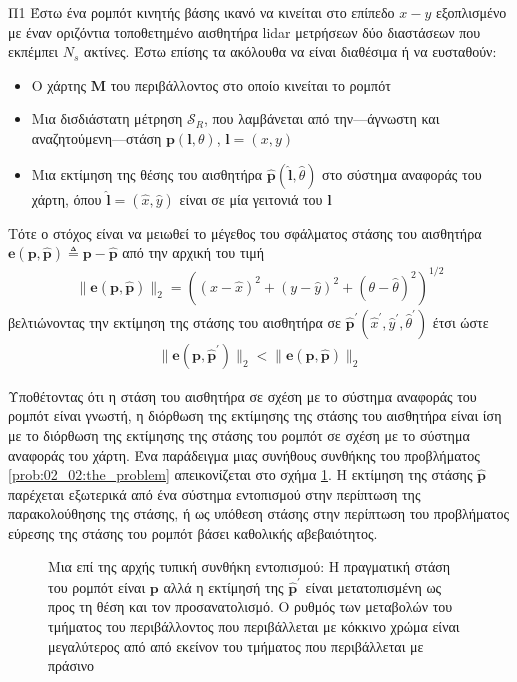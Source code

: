 \begin{bw_box}
\begin{customproblem}{Π1}
  \label{prob:02_02:the_problem}
  Έστω ένα ρομπότ κινητής βάσης ικανό να κινείται στο επίπεδο $x-y$ εξοπλισμένο
  με έναν οριζόντια τοποθετημένο αισθητήρα lidar μετρήσεων δύο διαστάσεων
  που εκπέμπει $N_s$ ακτίνες. Έστω επίσης τα ακόλουθα να είναι διαθέσιμα ή να
  ευσταθούν:
  \begin{itemize}
    \item Ο χάρτης $\bm{M}$ του περιβάλλοντος στο οποίο κινείται το ρομπότ
    \item Μια δισδιάστατη μέτρηση $\mathcal{S}_R$, που λαμβάνεται από
          την---άγνωστη και αναζητούμενη---στάση $\bm{p}(\bm{l},\theta)$,
          $\bm{l} = (x,y)$
    \item Μια εκτίμηση της θέσης του αισθητήρα
          $\hat{\bm{p}}(\hat{\bm{l}}, \hat{\theta})$ στο σύστημα αναφοράς του
          χάρτη, όπου $\hat{\bm{l}} = (\hat{x}, \hat{y})$ είναι σε μία γειτονιά
          του $\bm{l}$
  \end{itemize}
\end{customproblem}
Τότε ο στόχος είναι να μειωθεί το μέγεθος του σφάλματος στάσης του αισθητήρα
$\bm{e}(\bm{p}, \hat{\bm{p}}) \triangleq \bm{p}- \hat{\bm{p}}$ από την αρχική
του τιμή
\begin{align}
  \|\bm{e}(\bm{p}, \hat{\bm{p}})\|_2 = ((x- \hat{x})^2 + (y- \hat{y})^2 + (\theta- \hat{\theta})^2)^{1/2}
  \label{eq:pose_error_def}
\end{align}
βελτιώνοντας την εκτίμηση της στάσης του αισθητήρα σε
$\hat{\bm{p}}^\prime(\hat{x}^\prime, \hat{y}^\prime, \hat{\theta}^\prime)$ έτσι ώστε
\begin{align}
  \|\bm{e}(\bm{p}, \hat{\bm{p}}^\prime)\|_2 < \|\bm{e}(\bm{p}, \hat{\bm{p}})\|_2
  \tag{$\ast$}
  \label{obj:the_objective}
\end{align}
\end{bw_box}
Υποθέτοντας ότι η στάση του αισθητήρα σε σχέση με το σύστημα αναφοράς του
ρομπότ είναι γνωστή, η διόρθωση της εκτίμησης της στάσης του αισθητήρα είναι
ίση με το διόρθωση της εκτίμησης της στάσης του ρομπότ σε σχέση με το σύστημα
αναφοράς του χάρτη. Ένα παράδειγμα μιας συνήθους συνθήκης του προβλήματος
\ref{prob:02_02:the_problem} απεικονίζεται στο σχήμα
\ref{fig:02_02:the_problem}. Η εκτίμηση της στάσης $\hat{\bm{p}}$
παρέχεται εξωτερικά από ένα σύστημα εντοπισμού στην περίπτωση της
παρακολούθησης της στάσης, ή ως υπόθεση στάσης στην περίπτωση του προβλήματος
εύρεσης της στάσης του ρομπότ βάσει καθολικής αβεβαιότητος.

\begin{figure}[]\centering
  
  \caption{\small Μια επί της αρχής τυπική συνθήκη εντοπισμού: Η πραγματική
           στάση του ρομπότ είναι $\bm{p}$ αλλά η εκτίμησή της
           $\hat{\bm{p}}^\prime$ είναι μετατοπισμένη ως προς τη θέση και τον
           προσανατολισμό. Ο ρυθμός των μεταβολών του τμήματος του
           περιβάλλοντος που περιβάλλεται με κόκκινο χρώμα είναι μεγαλύτερος
           από από εκείνον του τμήματος που περιβάλλεται με πράσινο}
  \label{fig:02_02:the_problem}
\end{figure}
